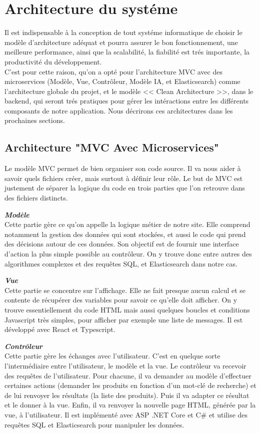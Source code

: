\section{Architecture du systéme}
\noindent
Il est indispensable à la conception de tout systéme informatique de choisir le modèle d'architecture adéquat et pourra assurer le bon fonctionnement, une meilleure performance, ainsi que la scalabilité, la fiabilité est trés importante, la productivité du développement. \\
C'est pour cette raison, qu'on a opté pour l'architecture MVC avec des microservices (Modèle, Vue, Contrôleur, Modèle IA, et Elasticsearch) comme l'architecture globale du projet, et le modèle << Clean Architecture >>, dans le backend, qui seront trés pratiques pour gérer les intéractions entre les différents composants de notre application. Nous décrirons ces architectures dans les prochaines sections.

\subsection{Architecture "MVC Avec Microservices"}
\noindent
Le modèle MVC permet de bien organiser son code source. Il va nous aider à savoir quels fichiers créer, mais surtout à définir leur rôle. Le but de MVC est justement de séparer la logique du code en trois parties que l'on retrouve dans des fichiers distincts.

\noindent
{\small\textbf{\textit{Modèle}}}\mbox{}\\
Cette partie gère ce qu'on appelle la logique métier de notre site. Elle comprend notamment la gestion des données qui sont stockées, et aussi le code qui prend des décisions autour de ces données. Son objectif est de fournir une interface d'action la plus simple possible au contrôleur. On y trouve donc entre autres des algorithmes complexes et des requêtes SQL, et Elasticsearch dans notre cas.

\noindent
{\small\textbf{\textit{Vue}}}\mbox{}\\
Cette partie se concentre sur l'affichage. Elle ne fait presque aucun calcul et se contente de récupérer des variables pour savoir ce qu'elle doit afficher. On y trouve essentiellement du code HTML mais aussi quelques boucles et conditions Javascript très simples, pour afficher par exemple une liste de messages. Il est développé avec React et Typescript.

\noindent
{\small\textbf{\textit{Contrôleur}}}\mbox{}\\
Cette partie gère les échanges avec l'utilisateur. C'est en quelque sorte l'intermédiaire entre l'utilisateur, le modèle et la vue. Le contrôleur va recevoir des requêtes de l'utilisateur. Pour chacune, il va demander au modèle d'effectuer certaines actions (demander les produits en fonction d'un mot-clé de recherche) et de lui renvoyer les résultats (la liste des produits). Puis il va adapter ce résultat et le donner à la vue. Enfin, il va renvoyer la nouvelle page HTML, générée par la vue, à l'utilisateur. Il est implémenté avec ASP .NET Core et C\# et utilise des requêtes SQL et Elasticsearch pour manipuler les données.

